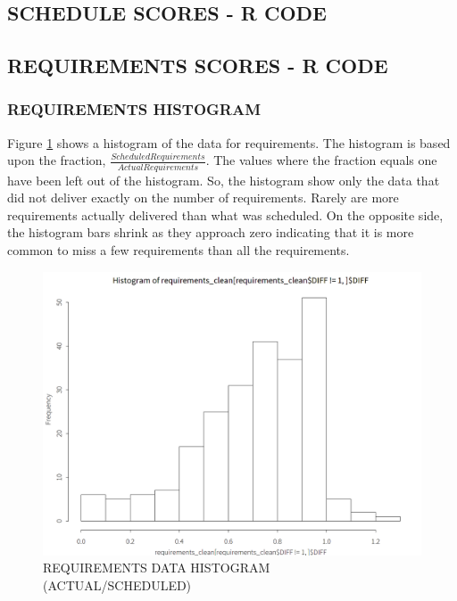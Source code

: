 \documentclass[SDSUThesis.tex]{subfiles}
\begin{document}
    \subsection{SCHEDULE SCORES - R CODE}
        
        
    \subsection{REQUIREMENTS SCORES - R CODE}
        \subsubsection{REQUIREMENTS HISTOGRAM}
        \label{app:requirements-hist}
            Figure \ref{fig:req-hist} shows a histogram of the data
            for requirements.  The histogram is based upon the
            fraction, $\frac{Scheduled Requirements}{Actual Requirements}$. The
            values where the fraction equals one have been left out of the histogram.
            So, the histogram show only the data that did not deliver exactly
            on the number of requirements. Rarely are more requirements actually 
            delivered than what was scheduled.  On the opposite side, the histogram
            bars shrink as they approach zero indicating that it is more common
            to miss a few requirements than all the requirements.
            
            \begin{figure}[ht]
                \centering
                \includegraphics[scale=.3]{images/req_hist.png}
                \caption{REQUIREMENTS DATA HISTOGRAM (ACTUAL/SCHEDULED)}
                \label{fig:req-hist}
            \end{figure}
        
\end{document}

